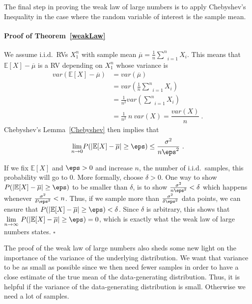 The final step in proving the weak law of large numbers is to apply Chebyshev's Inequality in the case where the random variable of interest is
the sample mean.

\paragraph{Proof of Theorem~\ref{weakLaw}} We assume i.i.d.\ RVs $ X_{1}^{n} $ with sample mean $ \overline{\mu} = \frac{1}{n} \underset{i=1}{\overset{n}{\sum}} X_{i} $. 
This means that $ \mathbb{E}[X] - \overline{\mu} $  is a RV depending on $ X_{1}^{n} $ whose variance is
\begin{align}
var(\mathbb{E}[X] - \overline{\mu}) &= var(\overline{\mu}) \\ 
&= var\left(\frac{1}{n} \underset{i=1}{\overset{n}{\sum}} X_{i} \right) \\
&= \frac{1}{n^{2}}var\left(\underset{i=1}{\overset{n}{\sum}} X_i\right) \\
&= \frac{1}{n^{2}}~n~var(X) = \dfrac{var(X)}{n} \ .
\end{align}
Chebyshev's Lemma~\ref{Chebyshev} then implies that 
\begin{equation}
\underset{n \rightarrow 0}{\lim}P(|\mathbb{E}[X] - \overline{\mu}| \geq \eps) \leq \frac{\sigma^{2}}{n\eps^{2}} \ .
\end{equation}

If we fix $ \mathbb{E}[X] $ and $ \eps > 0 $ and increase $n$, the number of i.i.d.\ samples, this probability will go to 0.
More formally, choose $ \delta > 0 $. One way to show $ P(|\mathbb{E}[X] - \overline{\mu}| \geq \eps) $ to be smaller than $ \delta $, is to show 
$ \frac{\sigma^{2}}{n\eps^{2}} < \delta $ which happens whenever $ \frac{\sigma^{2}}{\delta\eps^{2}} < n $. Thus, if we sample
more than $ \frac{\sigma^{2}}{\delta\eps^{2}} $ data points, we can ensure that $ P(|\mathbb{E}[X] - \overline{\mu}| \geq \eps) < \delta $.
Since $ \delta $ is arbitrary, this shows that $ \underset{n \rightarrow \infty}{\lim}~P(|\mathbb{E}[X] - \overline{\mu}| \geq \eps) = 0 $, 
which is exactly what the weak law of large numbers states. $ \square $ \bigskip

The proof of the weak law of large numbers also sheds some new light on the importance of the variance of the underlying distribution. 
We want that variance to be as small as possible
since we then need fewer samples in order to have a close estimate of the true mean of the data-generating distribution. 
Thus, it is helpful if the variance of the 
data-generating distribution is small. Otherwise we need a lot of samples.

